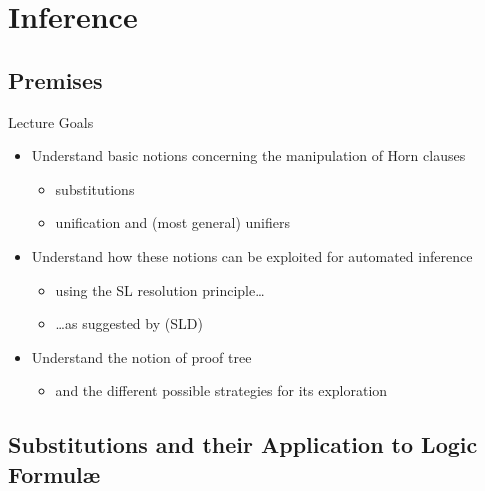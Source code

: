 \documentclass[presentation]{beamer}\mode<presentation>{\usetheme{AMSBolognaFC}}
\begin{document}
\section{Inference}

\subsection{Premises}

\begin{frame}{Lecture Goals}
    \begin{itemize}
        \item Understand basic notions concerning the \alert{manipulation} of Horn clauses
        \begin{itemize}
            \item substitutions
            \item unification and (most general) unifiers
        \end{itemize}

        \vfill

        \item Understand how these notions can be exploited for \alert{automated inference}
        \begin{itemize}
            \item using the SL resolution principle\ldots
            \item \ldots as suggested by \cite{KowVan1970} (SLD)
        \end{itemize}

        \vfill

        \item Understand the notion of \alert{proof tree}
        \begin{itemize}
            \item and the different possible strategies for its \alert{exploration}
        \end{itemize}
    \end{itemize}
\end{frame}

\subsection{Substitutions and their Application to Logic Formul\ae{}}
\end{document}
